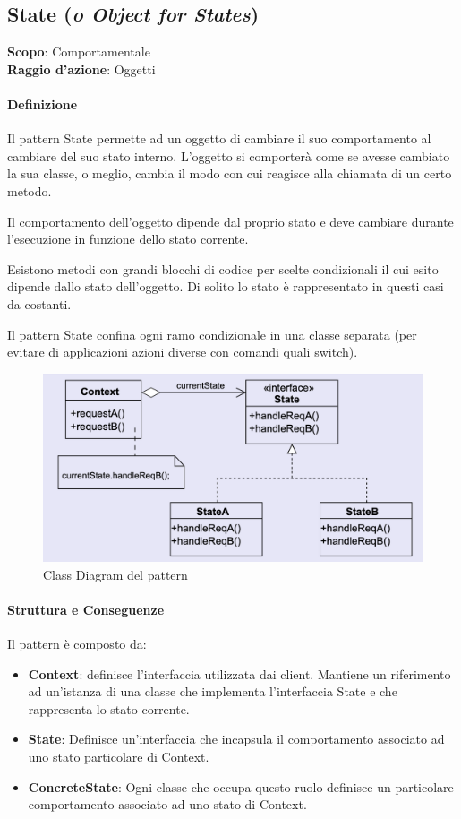 \subsection{State (\textit{o Object for States})}
\label{state}

\textbf{Scopo}: Comportamentale \\
\textbf{Raggio d'azione}: Oggetti

\paragraph{Definizione} Il pattern State permette ad un oggetto di cambiare il suo comportamento al cambiare del suo stato interno. L'oggetto si comporterà come se avesse cambiato la sua classe, o meglio, cambia il modo con cui reagisce alla chiamata di un certo metodo.

Il comportamento dell'oggetto dipende dal proprio stato e deve cambiare durante l'esecuzione in funzione dello stato corrente.

Esistono metodi con grandi blocchi di codice per scelte condizionali il cui esito dipende dallo stato dell’oggetto. Di solito lo stato è rappresentato in questi casi da costanti. 

Il pattern State confina ogni ramo condizionale in una classe separata (per evitare di applicazioni azioni diverse con comandi quali switch).

\begin{figure}[H]
    \centering
    \includegraphics[width=1\linewidth]{assets/pattern/state/state-struttura.png}
    \caption{Class Diagram del pattern}
\end{figure}

\paragraph{Struttura e Conseguenze} Il pattern è composto da:
\begin{itemize}
    \item \textbf{Context}: definisce l’interfaccia utilizzata dai client. Mantiene un riferimento ad un’istanza di una classe che implementa l’interfaccia State e che rappresenta lo stato corrente. 
    \item \textbf{State}: Definisce un’interfaccia che incapsula il comportamento associato ad uno stato particolare di Context. 
    \item \textbf{ConcreteState}: Ogni classe che occupa questo ruolo definisce un particolare comportamento associato ad uno stato di Context.
\end{itemize}

